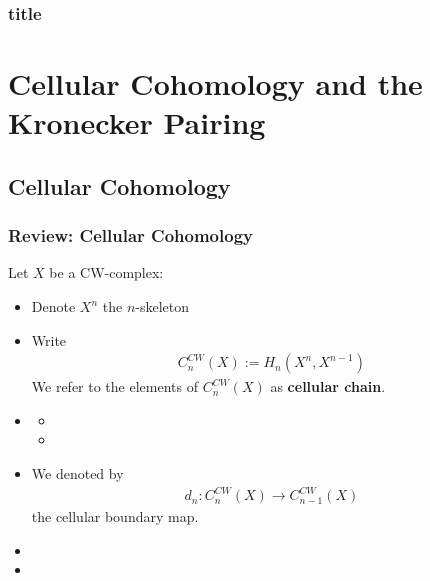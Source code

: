 \documentclass[Total.tex]{subfiles}
\begin{document}
					\subsubsection{title}
			\section{Cellular Cohomology and the Kronecker Pairing}
				\subsection{Cellular Cohomology}
					
				\subsubsection{Review: Cellular Cohomology}
					\begin{Def}
						Let $X$ be a CW-complex:
						\begin{itemize}
							\item Denote $X^n$ the $n$-skeleton
							\item Write
							\begin{gather*}
								C^{CW}_n(X):=H_n(X^n,X^{n-1})
							\end{gather*}
							We refer to the elements of $C^{CW}_n(X)$ as \textbf{cellular chain}.
							\item \begin{itemize}
								\item 
								\item 
							\end{itemize}
							\item We denoted by
							\begin{gather*}
								d_n:C_n^{CW}(X)\rightarrow C_{n-1}^{CW}(X)
							\end{gather*}
							the cellular boundary map.
							\item 
							\item 
						\end{itemize}
					\end{Def}
					
\end{document}
